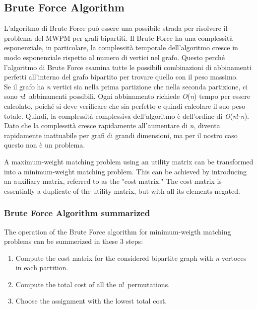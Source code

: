 \subsection{Brute Force Algorithm}
L'algoritmo di Brute Force può essere una possibile strada per risolvere il problema del MWPM per grafi bipartiti.
Il Brute Force ha una complessità esponenziale, in particolare, la complessità temporale dell'algoritmo cresce in modo esponenziale rispetto al numero di vertici nel grafo.
Questo perché l'algoritmo di Brute Force esamina tutte le possibili combinazioni di abbinamenti perfetti all'interno del grafo bipartito per trovare quello con il peso massimo. \\
Se il grafo ha \textit{n} vertici sia nella prima partizione che nella seconda partizione, ci sono \textit{n}!\ abbinamenti possibili.
Ogni abbinamento richiede \textit{O}(\textit{n}) tempo per essere calcolato, poiché si deve verificare che sia perfetto e quindi calcolare il suo peso totale.
Quindi, la complessità complessiva dell'algoritmo è dell'ordine di \textit{O}(\textit{n}!$\cdot$\textit{n}). \\
Dato che la complessità cresce rapidamente all'aumentare di \textit{n}, diventa rapidamente inattuabile per grafi di grandi dimensioni, ma per il nostro caso questo non è un problema.

A maximum-weight matching problem using an utility matrix can be transformed into a minimum-weight matching problem.
This can be achieved by introducing an auxiliary matrix, referred to as the "cost matrix."
The cost matrix is essentially a duplicate of the utility matrix, but with all its elements negated.

\subsubsection{Brute Force Algorithm summarized}
The operation of the Brute Force algorithm for minimum-weigth matching problems can be summerized in these 3 steps:

\begin{enumerate}
    \item {Compute the cost matrix for the considered bipartite graph with \textit{n} vertoces in each partition.}
    \item {Compute the total cost of all the \textit{n}!\ permutations.}
    \item {Choose the assignment with the lowest total cost.}
\end{enumerate}


